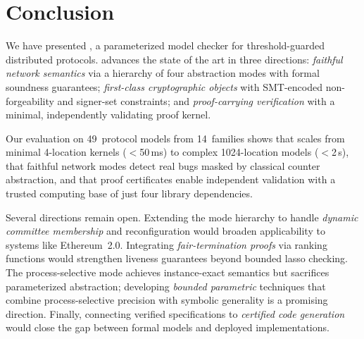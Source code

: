 \section{Conclusion}\label{sec:conclusion}

We have presented \tarsier{}, a parameterized model checker for
threshold-guarded distributed protocols.  \tarsier{} advances the
state of the art in three directions: \emph{faithful network
semantics} via a hierarchy of four abstraction modes with formal
soundness guarantees; \emph{first-class cryptographic objects} with
SMT-encoded non-forgeability and signer-set constraints; and
\emph{proof-carrying verification} with a minimal, independently
validating proof kernel.

Our evaluation on 49~protocol models from 14~families shows that
\tarsier{} scales from minimal 4-location kernels ($<$50\,ms) to
complex 1024-location models ($<$2\,s), that faithful network modes
detect real bugs masked by classical counter abstraction, and that
proof certificates enable independent validation with a trusted
computing base of just four library dependencies.

Several directions remain open.  Extending the mode hierarchy to handle
\emph{dynamic committee membership} and reconfiguration would broaden
applicability to systems like Ethereum~2.0.  Integrating
\emph{fair-termination proofs} via ranking functions would strengthen
liveness guarantees beyond bounded lasso checking.  The
process-selective mode achieves instance-exact semantics but sacrifices
parameterized abstraction; developing \emph{bounded parametric}
techniques that combine process-selective precision with symbolic
generality is a promising direction.  Finally, connecting verified
specifications to \emph{certified code generation} would close the gap
between formal models and deployed implementations.
